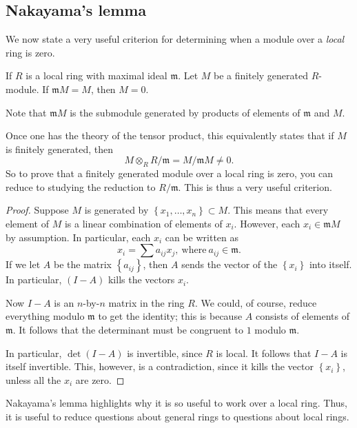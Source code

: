 \subsection{Nakayama's lemma}

We now state a very useful criterion for determining when a module over a
\emph{local} ring is zero.


\begin{lemma} \label{nakayama} If $R$ is a local ring with
maximal ideal
$\mathfrak{m}$. Let $M$ be a finitely generated $R$-module.  If
$\mathfrak{m}M = M$, then $M = 0$.
\end{lemma}

Note that $\mathfrak{m}M$ is the submodule generated by products of
elements of $\mathfrak{m}$ and $M$.

\begin{remark}
Once one has the theory of the tensor product, this equivalently states that
if $M$ is finitely generated, then
\[ M \otimes_R R/\mathfrak{m} = M/\mathfrak{m}M \neq 0.  \]
So to prove that a finitely generated module over a local ring is zero, you
can reduce to studying the reduction to $R/\mathfrak{m}$. This is thus a very
useful criterion.
\end{remark}


\begin{proof}
Suppose $M$ is generated by $\left\{x_1, \dots, x_n\right\} \subset M$. This
means that every element of $M$ is  a linear combination of elements of
$x_i$. However, each $x_i \in \mathfrak{m}M$ by assumption. In particular, each
$x_i$ can be written as
\[ x_i = \sum a_{ij} x_j, \ \mathrm{where} \ a_{ij} \in \mathfrak{m}.  \]
If we let $A$ be the matrix $\left\{a_{ij}\right\}$, then $A$ sends the
vector of the $\left\{x_i\right\}$ into itself. In particular, $(I-A)$ kills
the vectors $x_i$.

Now $I-A$ is an $n$-by-$n$ matrix in the ring $R$. We could, of course,
reduce everything modulo $\mathfrak{m}$ to get the identity; this is
because $A$ consists of elements of $\mathfrak{m}$. It follows that the
determinant must be congruent to $1$ modulo $\mathfrak{m}$.

In particular, $\det (I - A)$ is invertible, since $R$ is local.  It
follows that $I-A$ is itself invertible. This, however, is  a
contradiction, since it kills the vector $\left\{x_i\right\}$, unless all the
$x_i $ are zero.
\end{proof}

Nakayama's lemma highlights why it is so useful to work over a local ring.
Thus, it is useful to reduce questions about general rings to questions about
local rings.

